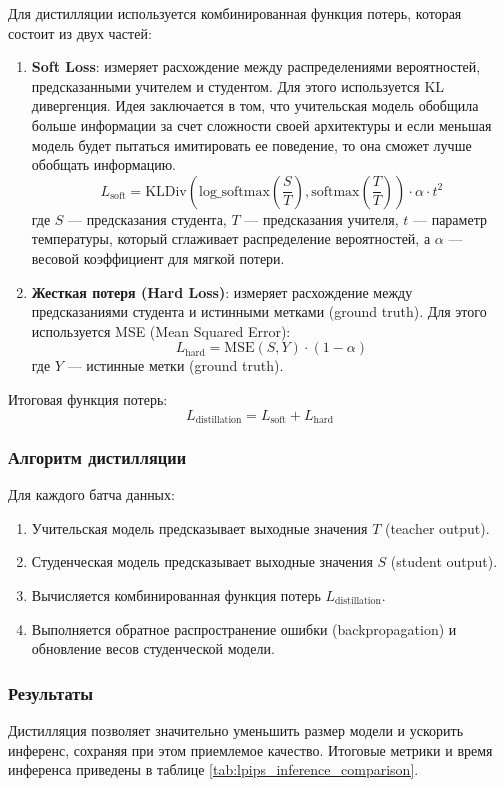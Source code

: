\documentclass[14pt]{article}
\begin{document}
Для дистилляции используется комбинированная функция потерь, которая состоит из двух частей:
\begin{enumerate}
    \item \textbf{Soft Loss}: измеряет расхождение между распределениями вероятностей, предсказанными учителем и студентом. Для этого используется KL дивергенция.
    Идея заключается в том, что учительская модель обобщила больше информации за счет сложности своей архитектуры и если
    меньшая модель будет пытаться имитировать ее поведение, то она сможет лучше обобщать информацию.
    $$
    L_{\text{soft}} = \text{KLDiv} \left( \text{log\_softmax}\left(\frac{S}{T}\right), \text{softmax}\left(\frac{T}{T}\right) \right) \cdot \alpha \cdot t^2
    $$
    где $ S $ — предсказания студента, $ T $ — предсказания учителя, $ t $ — параметр температуры,
    который сглаживает распределение вероятностей, а $ \alpha $ — весовой коэффициент для мягкой потери.

    \item \textbf{Жесткая потеря (Hard Loss)}: измеряет расхождение между предсказаниями студента и истинными метками (ground truth). Для этого используется MSE (Mean Squared Error):
    $$
    L_{\text{hard}} = \text{MSE}(S, Y) \cdot (1 - \alpha)
    $$
    где $ Y $ — истинные метки (ground truth).
\end{enumerate}

Итоговая функция потерь:
$$
L_{\text{distillation}} = L_{\text{soft}} + L_{\text{hard}}
$$

\subsubsection*{Алгоритм дистилляции}
Для каждого батча данных:
\begin{enumerate}
    \item Учительская модель предсказывает выходные значения $ T $ (teacher output).
    \item Студенческая модель предсказывает выходные значения $ S $ (student output).
    \item Вычисляется комбинированная функция потерь $ L_{\text{distillation}} $.
    \item Выполняется обратное распространение ошибки (backpropagation) и обновление весов студенческой модели.
\end{enumerate}



\subsubsection*{Результаты}
Дистилляция позволяет значительно уменьшить размер модели и ускорить инференс,
сохраняя при этом приемлемое качество.
Итоговые метрики и время инференса приведены в таблице \ref{tab:lpips_inference_comparison}.
\end{document}
